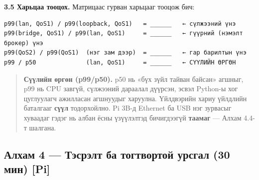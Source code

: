 \begin{longtable}[]{@{}lllllllll@{}}
\begin{minipage}[t]{0.08\columnwidth}
\strut
\end{minipage} & \begin{minipage}[t]{0.08\columnwidth}\raggedright
\strut
\end{minipage} & \begin{minipage}[t]{0.08\columnwidth}\raggedright
\strut
\end{minipage} & \begin{minipage}[t]{0.08\columnwidth}\raggedright
\strut
\end{minipage} & \begin{minipage}[t]{0.08\columnwidth}\raggedright
\strut
\end{minipage} & \begin{minipage}[t]{0.08\columnwidth}\raggedright
\strut
\end{minipage} & \begin{minipage}[t]{0.08\columnwidth}\raggedright
\strut
\end{minipage}\tabularnewline
\bottomrule
\end{longtable}\endgroup

\textbf{3.5 Харьцаа тооцох.} Матрицаас гурван харьцааг тооцож бич:

\begin{verbatim}
p99(lan, QoS1) / p99(loopback, QoS1)   = ______   ← сүлжээний үнэ
p99(bridge, QoS1) / p99(lan, QoS1)     = ______   ← гүүрний (нэмэлт брокер) үнэ
p99(QoS2) / p99(QoS1)  (нэг зам дээр)  = ______   ← гар барилтын үнэ
p99 / p50              (lan, QoS1)     = ______   ← СҮҮЛИЙН ӨРГӨН
\end{verbatim}

\begin{quote}
\textbf{Сүүлийн өргөн (p99/p50).} p50 нь «бүх зүйл тайван байсан» агшныг, p99 нь CPU завгүй, сүлжээний дараалал дүүрсэн, эсвэл Python-ы хог цуглуулагч ажилласан агшнуудыг харуулна. Үйлдвэрийн хариу үйлдлийн баталгааг \textbf{сүүл} тодорхойлно. Pi 3B-д Ethernet ба USB нэг зурвасыг хуваадаг гэдэг нь албан ёсны үзүүлэлтэд бичигдээгүй \textbf{таамаг} --- Алхам 4.4-т шалгана.
\end{quote}

\hypertarget{ux430ux43bux445ux430ux43c-4-ux442ux44dux441ux440ux44dux43bux442-ux431ux430-ux442ux43eux433ux442ux432ux43eux440ux442ux43eux439-ux443ux440ux441ux433ux430ux43b-30-ux43cux438ux43d-pi}{%
\subsection{Алхам 4 --- Тэсрэлт ба тогтвортой урсгал (30 мин) {[}Pi{]}}\label{ux430ux43bux445ux430ux43c-4-ux442ux44dux441ux440ux44dux43bux442-ux431ux430-ux442ux43eux433ux442ux432ux43eux440ux442ux43eux439-ux443ux440ux441ux433ux430ux43b-30-ux43cux438ux43d-pi}}

